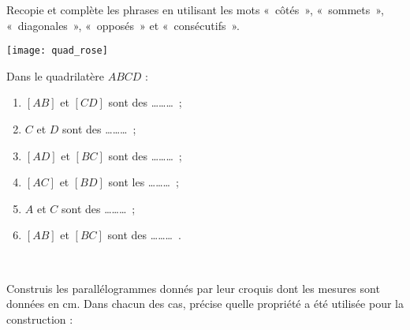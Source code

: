 
\begin{exercice}
Recopie et complète les phrases en utilisant les mots « côtés », « sommets », « diagonales », « opposés » et « consécutifs ».\\[-3em]
\begin{minipage}[c]{0.26\linewidth}
\vspace{2cm}
 \texttt{[image: quad\_rose]}
 \end{minipage} \hfill%
 \begin{minipage}[t]{0.66\linewidth}
 Dans le quadrilatère $ABCD$ :
 \begin{enumerate}
  \item $[AB]$ et $[CD]$ sont des \ldots \ldots \ldots ;
  \item $C$ et $D$ sont des \ldots \ldots \ldots ;
  \item $[AD]$ et $[BC]$ sont des \ldots \ldots \ldots ;
  \item $[AC]$ et $[BD]$ sont les \ldots \ldots \ldots ;
  \item $A$ et $C$ sont des \ldots \ldots \ldots ;
  \item $[AB]$ et $[BC]$ sont des \ldots \ldots \ldots .
  \end{enumerate}
 \end{minipage} \\
\end{exercice}




\begin{exercice}
Construis les parallélogrammes donnés par leur croquis dont les mesures sont données en cm. Dans chacun des cas, précise quelle propriété a été utilisée pour la construction :
\begin{colenumerate}{2}
 \item
 
 
  \item
 
 
  \item
 
 
  \item
 
 
 \end{colenumerate}
\end{exercice}


